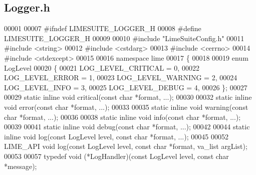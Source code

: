 \subsection{Logger.\+h}
\label{Logger_8h_source}

\begin{DoxyCode}
00001 
00007 \textcolor{preprocessor}{#ifndef LIMESUITE\_LOGGER\_H}
00008 \textcolor{preprocessor}{#define LIMESUITE\_LOGGER\_H}
00009 
00010 \textcolor{preprocessor}{#include "LimeSuiteConfig.h"}
00011 \textcolor{preprocessor}{#include <string>}
00012 \textcolor{preprocessor}{#include <cstdarg>}
00013 \textcolor{preprocessor}{#include <cerrno>}
00014 \textcolor{preprocessor}{#include <stdexcept>}
00015 
00016 \textcolor{keyword}{namespace }lime
00017 \{
00018 
00019 \textcolor{keyword}{enum} LogLevel
00020 \{
00021     LOG_LEVEL_CRITICAL = 0, 
00022     LOG_LEVEL_ERROR    = 1, 
00023     LOG_LEVEL_WARNING  = 2, 
00024     LOG_LEVEL_INFO     = 3, 
00025     LOG_LEVEL_DEBUG    = 4, 
00026 \};
00027 
00029 \textcolor{keyword}{static} \textcolor{keyword}{inline} \textcolor{keywordtype}{void} critical(\textcolor{keyword}{const} \textcolor{keywordtype}{char} *format, ...);
00030 
00032 \textcolor{keyword}{static} \textcolor{keyword}{inline} \textcolor{keywordtype}{void} error(\textcolor{keyword}{const} \textcolor{keywordtype}{char} *format, ...);
00033 
00035 \textcolor{keyword}{static} \textcolor{keyword}{inline} \textcolor{keywordtype}{void} warning(\textcolor{keyword}{const} \textcolor{keywordtype}{char} *format, ...);
00036 
00038 \textcolor{keyword}{static} \textcolor{keyword}{inline} \textcolor{keywordtype}{void} info(\textcolor{keyword}{const} \textcolor{keywordtype}{char} *format, ...);
00039 
00041 \textcolor{keyword}{static} \textcolor{keyword}{inline} \textcolor{keywordtype}{void} debug(\textcolor{keyword}{const} \textcolor{keywordtype}{char} *format, ...);
00042 
00044 \textcolor{keyword}{static} \textcolor{keyword}{inline} \textcolor{keywordtype}{void} log(\textcolor{keyword}{const} LogLevel level, \textcolor{keyword}{const} \textcolor{keywordtype}{char} *format, ...);
00045 
00052 LIME_API \textcolor{keywordtype}{void} log(\textcolor{keyword}{const} LogLevel level, \textcolor{keyword}{const} \textcolor{keywordtype}{char} *format, va\_list argList);
00053 
00057 \textcolor{keyword}{typedef} void (*LogHandler)(\textcolor{keyword}{const} LogLevel level, \textcolor{keyword}{const} \textcolor{keywordtype}{char} *message);

\end{DoxyCode}

